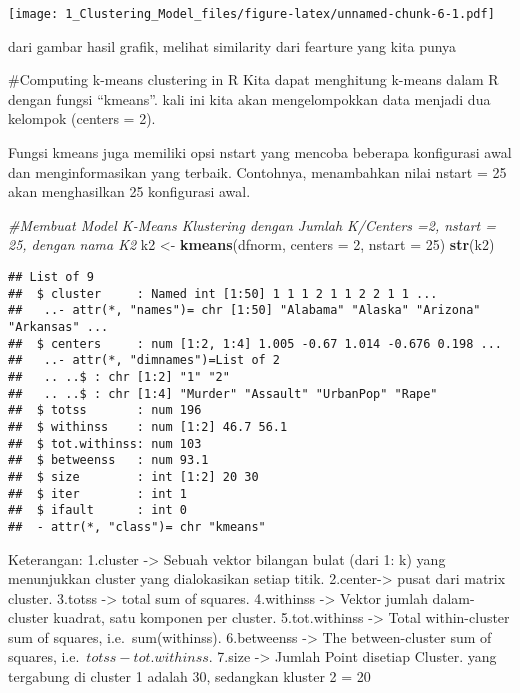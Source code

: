 \documentclass[]{article}
\newenvironment{Shaded}{\begin{snugshade}}{\end{snugshade}}
\newcommand{\CommentTok}[1]{\textcolor[rgb]{0.56,0.35,0.01}{\textit{#1}}}
\newcommand{\DataTypeTok}[1]{\textcolor[rgb]{0.13,0.29,0.53}{#1}}
\newcommand{\DecValTok}[1]{\textcolor[rgb]{0.00,0.00,0.81}{#1}}
\newcommand{\KeywordTok}[1]{\textcolor[rgb]{0.13,0.29,0.53}{\textbf{#1}}}
\newcommand{\NormalTok}[1]{#1}
\newcommand{\StringTok}[1]{\textcolor[rgb]{0.31,0.60,0.02}{#1}}
\begin{document}
\texttt{[image: 1\_Clustering\_Model\_files/figure-latex/unnamed-chunk-6-1.pdf]}

dari gambar hasil grafik, melihat similarity dari fearture yang kita
punya

\#Computing k-means clustering in R Kita dapat menghitung k-means dalam
R dengan fungsi ``kmeans''. kali ini kita akan mengelompokkan data
menjadi dua kelompok (centers = 2).

Fungsi kmeans juga memiliki opsi nstart yang mencoba beberapa
konfigurasi awal dan menginformasikan yang terbaik. Contohnya,
menambahkan nilai nstart = 25 akan menghasilkan 25 konfigurasi awal.

\begin{Shaded}
\begin{Highlighting}[]
\CommentTok{#Membuat Model K-Means Klustering dengan Jumlah K/Centers =2, nstart = 25, dengan nama K2}
\NormalTok{k2 <-}\StringTok{ }\KeywordTok{kmeans}\NormalTok{(dfnorm, }\DataTypeTok{centers =} \DecValTok{2}\NormalTok{, }\DataTypeTok{nstart =} \DecValTok{25}\NormalTok{)}
\KeywordTok{str}\NormalTok{(k2)}
\end{Highlighting}
\end{Shaded}

\begin{verbatim}
## List of 9
##  $ cluster     : Named int [1:50] 1 1 1 2 1 1 2 2 1 1 ...
##   ..- attr(*, "names")= chr [1:50] "Alabama" "Alaska" "Arizona" "Arkansas" ...
##  $ centers     : num [1:2, 1:4] 1.005 -0.67 1.014 -0.676 0.198 ...
##   ..- attr(*, "dimnames")=List of 2
##   .. ..$ : chr [1:2] "1" "2"
##   .. ..$ : chr [1:4] "Murder" "Assault" "UrbanPop" "Rape"
##  $ totss       : num 196
##  $ withinss    : num [1:2] 46.7 56.1
##  $ tot.withinss: num 103
##  $ betweenss   : num 93.1
##  $ size        : int [1:2] 20 30
##  $ iter        : int 1
##  $ ifault      : int 0
##  - attr(*, "class")= chr "kmeans"
\end{verbatim}

Keterangan: 1.cluster -\textgreater{} Sebuah vektor bilangan bulat (dari
1: k) yang menunjukkan cluster yang dialokasikan setiap titik.
2.center-\textgreater{} pusat dari matrix cluster. 3.totss
-\textgreater{} total sum of squares. 4.withinss -\textgreater{} Vektor
jumlah dalam-cluster kuadrat, satu komponen per cluster. 5.tot.withinss
-\textgreater{} Total within-cluster sum of squares, i.e.~sum(withinss).
6.betweenss -\textgreater{} The between-cluster sum of squares,
i.e.~\(totss-tot.withinss\). 7.size -\textgreater{} Jumlah Point
disetiap Cluster. yang tergabung di cluster 1 adalah 30, sedangkan
kluster 2 = 20
\end{document}
